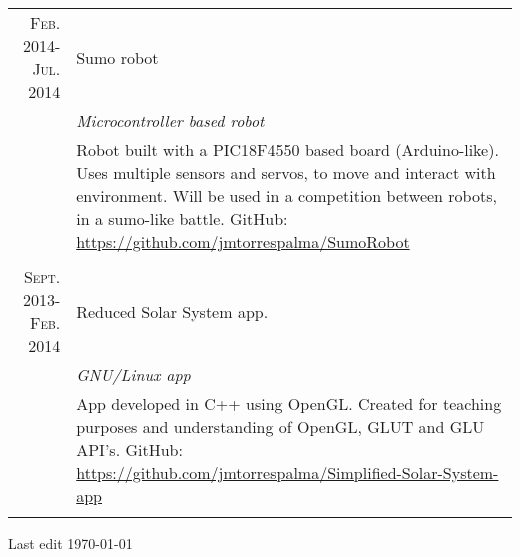 \documentclass[a4paper,10pt]{article}
\begin{document}
\begin{tabular}{r|p{11cm}}
\textsc{Feb. 2014-Jul. 2014} & Sumo robot \\&\emph{Microcontroller based robot}\\&\footnotesize{Robot built with a PIC18F4550 based board (Arduino-like). Uses multiple sensors and servos, to move and interact with environment. Will be used in a competition between robots, in a sumo-like battle. GitHub: \url{https://github.com/jmtorrespalma/SumoRobot}} \\\multicolumn{2}{c}{} \\

\textsc{Sept. 2013-Feb. 2014} & Reduced Solar System app.\\&\emph{GNU/Linux app}\\&\footnotesize{App developed in C++ using OpenGL. Created for teaching purposes and understanding of OpenGL, GLUT and GLU API's. GitHub: \url{https://github.com/jmtorrespalma/Simplified-Solar-System-app}} \\\multicolumn{2}{c}{} \\

\end{tabular}
\vfill\footnotesize{Last edit \today}

\end{document}
